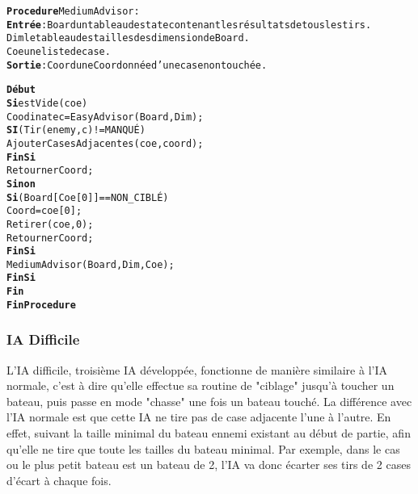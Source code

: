 \begin{alltt}
{\bf Procedure} MediumAdvisor :
    {\bf Entrée} : Board un tableau de state contenant les résultats de tous les tirs.
              Dim le tableau des tailles des dimension de Board.
              Coe une liste de case.
    {\bf Sortie} : Coord une Coordonnée d’une case non touchée.

    {\bf Début}
        {\bf Si} estVide(coe) 
            Coodinate c = EasyAdvisor(Board, Dim) ;
            {\bf SI} (Tir(enemy, c) != MANQUÉ)
                AjouterCasesAdjacentes(coe, coord) ;
            {\bf FinSi}
            Retourner Coord ;
        {\bf Sinon} 
            {\bf Si} (Board[Coe[0]] == NON_CIBLÉ)
                Coord = coe[0] ;
                Retirer(coe, 0) ;
                Retourner Coord ;
            {\bf FinSi}
            MediumAdvisor(Board, Dim, Coe);
        {\bf FinSi}
    {\bf Fin}
{\bf Fin Procedure}            
\end{alltt}

\newpage

\subsubsection{IA Difficile}
    L'IA difficile, troisième IA développée, fonctionne de manière similaire à l'IA normale, c'est à dire qu'elle effectue sa routine de "ciblage" jusqu'à toucher un bateau, puis passe en mode "chasse" une fois un bateau touché.
    La différence avec l'IA normale est que cette IA ne tire pas de case adjacente l'une à l'autre. En effet, suivant la taille minimal du bateau ennemi existant au début de partie, afin qu'elle ne tire que toute les tailles du bateau minimal.
    Par exemple, dans le cas ou le plus petit bateau est un bateau de 2, l'IA va donc écarter ses tirs de 2 cases d'écart à chaque fois.
    
